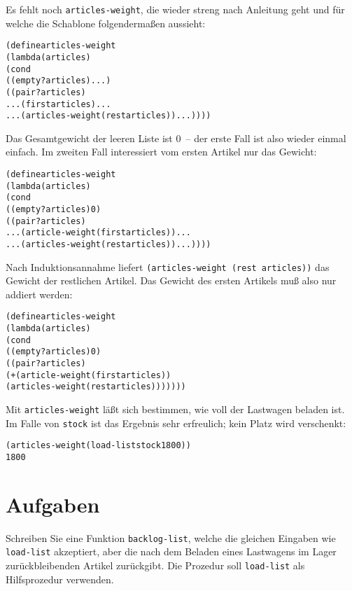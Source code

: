 %
Es fehlt noch \texttt{articles-weight}, die wieder streng nach Anleitung
geht und für welche die Schablone folgendermaßen aussieht:
%
\begin{alltt}
(define articles-weight
  (lambda (articles)
    (cond
     ((empty? articles) ...)
     ((pair? articles)
      ... (first articles) ...
      ... (articles-weight (rest articles)) ...))))
\end{alltt}
%
Das Gesamtgewicht der leeren Liste ist 0~-- der erste Fall ist also
wieder einmal einfach.  Im zweiten Fall interessiert vom ersten
Artikel nur das Gewicht:
%
\begin{alltt}
(define articles-weight
  (lambda (articles)
    (cond
     ((empty? articles) 0)
     ((pair? articles)
      ... (article-weight (first articles)) ...
      ... (articles-weight (rest articles)) ...))))
\end{alltt}
%
Nach Induktionsannahme liefert \texttt{(articles-weight (rest articles))} das
Gewicht der restlichen Artikel.  Das Gewicht des ersten Artikels muß also
nur addiert werden:
%
\begin{alltt}
(define articles-weight
  (lambda (articles)
    (cond
     ((empty? articles) 0)
     ((pair? articles)
      (+ (article-weight (first articles))
         (articles-weight (rest articles)))))))
\end{alltt}
%
Mit \texttt{articles-weight} läßt sich bestimmen, wie voll der
Lastwagen beladen ist.  Im Falle von \texttt{stock} ist das
Ergebnis sehr erfreulich; kein Platz wird verschenkt:
%
\begin{alltt}
(articles-weight (load-list stock 1800))
\evalsto{} 1800
\end{alltt}

\section*{Aufgaben}

\begin{aufgabe}
  Schreiben Sie eine Funktion \texttt{backlog-list}, welche die
  gleichen Eingaben wie \texttt{load-list} akzeptiert, aber die
  nach dem Beladen eines Lastwagens im Lager zurückbleibenden Artikel
  zurückgibt.  Die Prozedur soll 
  \texttt{load-list} als Hilfsprozedur verwenden.
\end{aufgabe}

